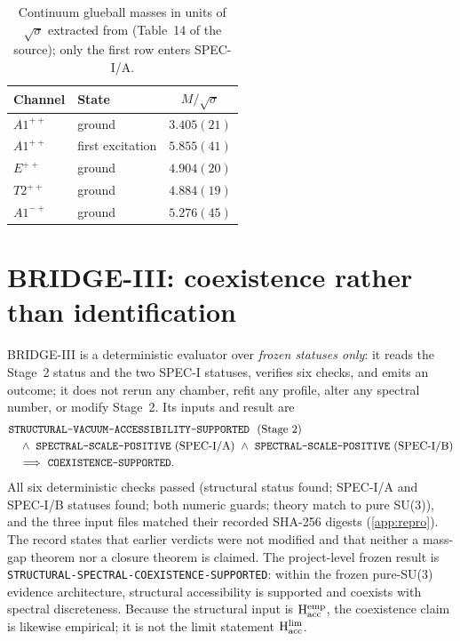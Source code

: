 \documentclass[11pt,a4paper]{article}
\theoremstyle{definition}
\theoremstyle{remark}
\newcommand{\sqs}{\sqrt{\sigma}}
\newcommand{\Hacc}{\mathrm{H}_{\mathrm{acc}}}
\begin{document}
\begin{table}[t]
\centering\small
\caption{Continuum glueball masses in units of $\sqs$ extracted from \cite{AT20} (Table~14 of the source); only the first row enters SPEC-I/A.}\label{tab:cont}
\begin{tabular}{@{}llc@{}}\toprule Channel & State & $M/\sqs$\\\midrule
$A1^{++}$ & ground & $3.405(21)$\\
$A1^{++}$ & first excitation & $5.855(41)$\\
$E^{++}$ & ground & $4.904(20)$\\
$T2^{++}$ & ground & $4.884(19)$\\
$A1^{-+}$ & ground & $5.276(45)$\\
\bottomrule\end{tabular}
\end{table}

\section{BRIDGE-III: coexistence rather than identification}\label{sec:bridge}

BRIDGE-III is a deterministic evaluator over \emph{frozen statuses only}: it reads the Stage~2 status and the two SPEC-I statuses, verifies six checks, and emits an outcome; it does not rerun any chamber, refit any profile, alter any spectral number, or modify Stage~2. Its inputs and result are
\[
\begin{aligned}
&\texttt{STRUCTURAL-\allowbreak{}VACUUM-\allowbreak{}ACCESSIBILITY-\allowbreak{}SUPPORTED}\ \ (\text{Stage 2})\\
&\quad\wedge\ \texttt{SPECTRAL-\allowbreak{}SCALE-\allowbreak{}POSITIVE}\ (\text{SPEC-I/A})\ \wedge\ \texttt{SPECTRAL-\allowbreak{}SCALE-\allowbreak{}POSITIVE}\ (\text{SPEC-I/B})\\
&\quad\Longrightarrow\ \texttt{COEXISTENCE-\allowbreak{}SUPPORTED}.
\end{aligned}
\]
All six deterministic checks passed (structural status found; SPEC-I/A and SPEC-I/B statuses found; both numeric guards; theory match to pure SU(3)), and the three input files matched their recorded SHA-256 digests (\cref{app:repro}). The record states that earlier verdicts were not modified and that neither a mass-gap theorem nor a closure theorem is claimed. The project-level frozen result is \texttt{STRUCTURAL-\allowbreak{}SPECTRAL-\allowbreak{}COEXISTENCE-\allowbreak{}SUPPORTED}: within the frozen pure-SU(3) evidence architecture, structural accessibility is supported and coexists with spectral discreteness. Because the structural input is $\Hacc^{\rm emp}$, the coexistence claim is likewise empirical; it is not the limit statement $\Hacc^{\rm lim}$.
\end{document}
